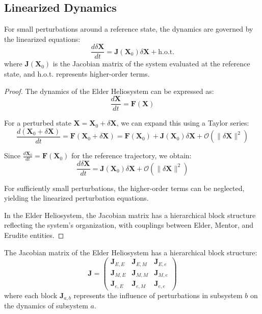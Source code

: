 \subsection{Linearized Dynamics}

\begin{theorem}
For small perturbations around a reference state, the dynamics are governed by the linearized equations:
\begin{equation}
\frac{d\delta\mathbf{X}}{dt} = \mathbf{J}(\mathbf{X}_0) \delta\mathbf{X} + \text{h.o.t.}
\end{equation}
where $\mathbf{J}(\mathbf{X}_0)$ is the Jacobian matrix of the system evaluated at the reference state, and h.o.t. represents higher-order terms.
\end{theorem}

\begin{proof}
The dynamics of the Elder Heliosystem can be expressed as:
\begin{equation}
\frac{d\mathbf{X}}{dt} = \mathbf{F}(\mathbf{X})
\end{equation}

For a perturbed state $\mathbf{X} = \mathbf{X}_0 + \delta\mathbf{X}$, we can expand this using a Taylor series:
\begin{equation}
\frac{d(\mathbf{X}_0 + \delta\mathbf{X})}{dt} = \mathbf{F}(\mathbf{X}_0 + \delta\mathbf{X}) = \mathbf{F}(\mathbf{X}_0) + \mathbf{J}(\mathbf{X}_0) \delta\mathbf{X} + \mathcal{O}(\|\delta\mathbf{X}\|^2)
\end{equation}

Since $\frac{d\mathbf{X}_0}{dt} = \mathbf{F}(\mathbf{X}_0)$ for the reference trajectory, we obtain:
\begin{equation}
\frac{d\delta\mathbf{X}}{dt} = \mathbf{J}(\mathbf{X}_0) \delta\mathbf{X} + \mathcal{O}(\|\delta\mathbf{X}\|^2)
\end{equation}

For sufficiently small perturbations, the higher-order terms can be neglected, yielding the linearized perturbation equations.

In the Elder Heliosystem, the Jacobian matrix has a hierarchical block structure reflecting the system's organization, with couplings between Elder, Mentor, and Erudite entities.
\end{proof}

\begin{definition}
The Jacobian matrix of the Elder Heliosystem has a hierarchical block structure:
\begin{equation}
\mathbf{J} = 
\begin{pmatrix}
\mathbf{J}_{E,E} & \mathbf{J}_{E,M} & \mathbf{J}_{E,e} \\
\mathbf{J}_{M,E} & \mathbf{J}_{M,M} & \mathbf{J}_{M,e} \\
\mathbf{J}_{e,E} & \mathbf{J}_{e,M} & \mathbf{J}_{e,e}
\end{pmatrix}
\end{equation}
where each block $\mathbf{J}_{a,b}$ represents the influence of perturbations in subsystem $b$ on the dynamics of subsystem $a$.
\end{definition}

